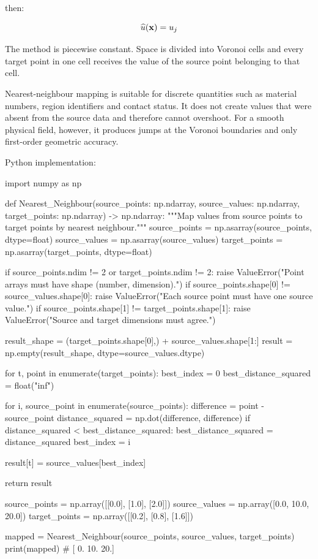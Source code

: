then:

\begin{equation}
    \widehat{u}(\mathbf{x}) = u_j
\end{equation}

The method is piecewise constant. Space is divided into Voronoi cells and every
target point in one cell receives the value of the source point belonging to
that cell.

Nearest-neighbour mapping is suitable for discrete quantities such as material
numbers, region identifiers and contact status. It does not create values that
were absent from the source data and therefore cannot overshoot. For a smooth
physical field, however, it produces jumps at the Voronoi boundaries and only
first-order geometric accuracy.

Python implementation:

\begin{python}
import numpy as np


def Nearest_Neighbour(source_points: np.ndarray,
                      source_values: np.ndarray,
                      target_points: np.ndarray) -> np.ndarray:
    """Map values from source points to target points by nearest neighbour."""
    source_points = np.asarray(source_points, dtype=float)
    source_values = np.asarray(source_values)
    target_points = np.asarray(target_points, dtype=float)

    if source_points.ndim != 2 or target_points.ndim != 2:
        raise ValueError("Point arrays must have shape (number, dimension).")
    if source_points.shape[0] != source_values.shape[0]:
        raise ValueError("Each source point must have one source value.")
    if source_points.shape[1] != target_points.shape[1]:
        raise ValueError("Source and target dimensions must agree.")

    result_shape = (target_points.shape[0],) + source_values.shape[1:]
    result = np.empty(result_shape, dtype=source_values.dtype)

    for t, point in enumerate(target_points):
        best_index = 0
        best_distance_squared = float("inf")

        for i, source_point in enumerate(source_points):
            difference = point - source_point
            distance_squared = np.dot(difference, difference)
            if distance_squared < best_distance_squared:
                best_distance_squared = distance_squared
                best_index = i

        result[t] = source_values[best_index]

    return result


source_points = np.array([[0.0], [1.0], [2.0]])
source_values = np.array([0.0, 10.0, 20.0])
target_points = np.array([[0.2], [0.8], [1.6]])

mapped = Nearest_Neighbour(source_points, source_values, target_points)
print(mapped)  # [ 0. 10. 20.]
\end{python}

